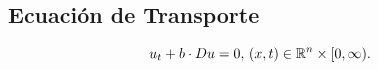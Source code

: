 \subsection{Ecuaci\'on de Transporte}

\[
  u_t + b \cdot D u = 0,\, (x, t) \in \mathbb R^n \times [0, \infty).  
\]